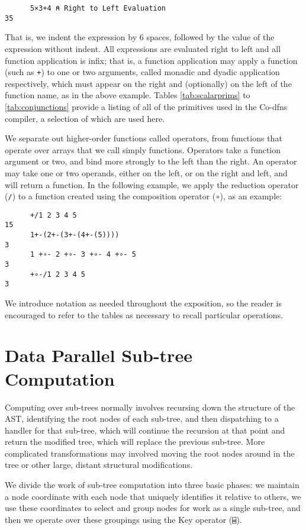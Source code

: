 \documentclass[numbers,9pt]{sigplanconf}
\begin{document}
\begin{verbatim}
      5×3+4 ⍝ Right to Left Evaluation
35
\end{verbatim}

\noindent
That is, we indent the expression by 6 spaces, followed by the value
of the expression without indent. All expressions are evaluated right to 
left and all function application is infix; that is, a function 
application may apply a function (such as \verb;+;) to one or two arguments, 
called monadic and dyadic application respectively,
which must appear on the right and (optionally) on the left of the function 
name, as in the above example. Tables \ref{tab:scalarprims} to 
\ref{tab:conjunctions}
provide a listing of all of the primitives used in the Co-dfns compiler, 
a selection of which are used here. 

We separate out higher-order functions called operators, from functions that 
operate over arrays that we call simply functions. Operators take a function 
argument or two, and bind more strongly to the left than the right. An 
operator may take one or two operands, either on the left, or on the 
right and left, and will return a function. In the following 
example, we apply the reduction operator (\verb;/;) to a function created using the 
composition operator (\verb;∘;), as an example:

\begin{verbatim}
      +/1 2 3 4 5
15
      1+-(2+-(3+-(4+-(5))))
3
      1 +∘- 2 +∘- 3 +∘- 4 +∘- 5
3
      +∘-/1 2 3 4 5
3
\end{verbatim}

\noindent
We introduce notation as needed throughout the exposition, so the reader 
is encouraged to refer to the tables as necessary to recall particular 
operations.


\section{Data Parallel Sub-tree Computation}

Computing over sub-trees normally involves recursing down the structure of 
the AST, identifying the root nodes of each sub-tree, and then dispatching
to a handler for that sub-tree, which will continue the recursion at that 
point and return the modified tree, which will replace the previous 
sub-tree. More complicated transformations may involved moving the root 
nodes around in the tree or other large, distant structural modifications. 

We divide the work of sub-tree computation into three basic phases:  
we maintain a node coordinate with each node that uniquely identifies it 
relative to others, we use these coordinates to select and group nodes for 
work as a single sub-tree, and then we operate over these groupings using 
the Key operator (\verb;⌸;).
\end{document}
